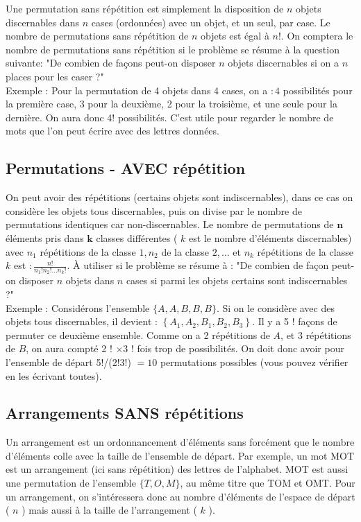 Une permutation sans répétition est simplement la disposition de \(n\) objets discernables dans \(n\) cases (ordonnées) avec un objet, et un seul, par case. Le nombre de permutations sans répétition de \(n\) objets est égal à \(n!\).
On comptera le nombre de permutations sans répétition si le problème se résume à la question suivante: "De combien de façons peut-on disposer \(n\) objets discernables si on a \(n\) places pour les caser ?"\\

Exemple : Pour la permutation de 4 objets dans 4 cases, on a \(: 4\) possibilités pour la première case, 3 pour la deuxième, 2 pour la troisième, et une seule pour la dernière. On aura donc 4! possibilités. C'est utile pour regarder le nombre de mots que l'on peut écrire avec des lettres données.

\subsection{Permutations - AVEC répétition}

On peut avoir des répétitions (certains objets sont indiscernables), dans ce cas on considère les objets tous discernables, puis on divise par le nombre de permutations identiques car non-discernables. Le nombre de permutations de \(\boldsymbol{n}\) éléments pris dans \(\boldsymbol{k}\) classes différentes ( \(k\) est le nombre d'éléments discernables) avec \(n_{1}\) répétitions de la classe \(1, n_{2}\) de la classe \(2, \ldots\) et \(n_{k}\) répétitions de la classe \(k\) est \(: \frac{n!}{n_{1}!n_{2}!\ldots n_{k}!}\).
À utiliser si le problème se résume à : "De combien de façon peut-on disposer \(n\) objets dans \(n\) cases si parmi les objets certains sont indiscernables ?"\\

Exemple : Considérons l'ensemble \(\{A, A, B, B, B\}\). Si on le considère avec des objets tous discernables, il devient : \(\left\{A_{1}, A_{2}, B_{1}, B_{2}, B_{3}\right\}\). Il y a 5 ! façons de permuter ce deuxième
ensemble. Comme on a 2 répétitions de \(A\), et 3 répétitions de \(B\), on aura compté 2 ! \(\times 3\) ! fois trop de possibilités. On doit donc avoir pour l'ensemble de départ 5!/(2!3!) \(=10\) permutations possibles (vous pouvez vérifier en les écrivant toutes).


\subsection{Arrangements SANS répétitions}
Un arrangement est un ordonnancement d'éléments sans forcément que le nombre d'éléments colle avec la taille de l'ensemble de départ. Par exemple, un mot MOT est un arrangement (ici sans répétition) des lettres de l'alphabet. MOT est aussi une permutation de l'ensemble \(\{T, O, M\}\), au même titre que TOM et OMT.
Pour un arrangement, on s'intéressera donc au nombre d'éléments de l'espace de départ ( \(n\) ) mais aussi à la taille de l'arrangement ( \(k\) ).\\

